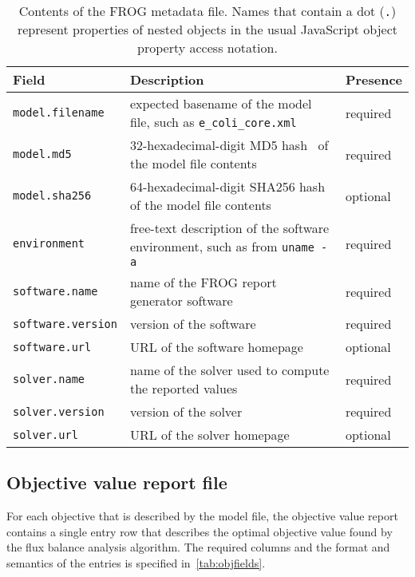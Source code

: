 \begin{table}[p]\tablefont
\begin{tabular}{lp{30em}l}
\toprule
Field & Description & Presence \\
\midrule
\verb|model.filename|
 & expected basename of the model file, such as \verb|e_coli_core.xml|
 & required
 \\
\verb|model.md5|
 & 32-hexadecimal-digit MD5 hash~\cite{rfc1321} of the model file contents
 & required
 \\
\verb|model.sha256|
 & 64-hexadecimal-digit SHA256 hash~\cite{national2008secure} of the model file contents
 & optional
 \\
\verb|environment|
 & free-text description of the software environment, such as from \verb|uname -a|
 & required
 \\
\verb|software.name|
 & name of the FROG report generator software
 & required
 \\
\verb|software.version|
 & version of the software
 & required
 \\
\verb|software.url|
 & URL of the software homepage
 & optional
 \\
\verb|solver.name|
 & name of the solver used to compute the reported values
 & required
 \\
\verb|solver.version|
 & version of the solver
 & required
 \\
\verb|solver.url|
 & URL of the solver homepage
 & optional
 \\
\bottomrule
\end{tabular}
\caption[Contents of the FROG metadata file.]{Contents of the FROG metadata file. Names that contain a dot (\texttt{.}) represent properties of nested objects in the usual JavaScript object property access notation.}
\label{tab:metafields}
\end{table}

\subsection{Objective value report file}
\label{sec:obj}

For each objective that is described by the model file, the objective value report contains a single entry row that describes the optimal objective value found by the flux balance analysis algorithm. The required columns and the format and semantics of the entries is specified in~\cref{tab:objfields}.



